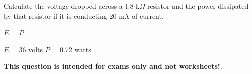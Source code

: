 

Calculate the voltage dropped across a 1.8 k$\Omega$ resistor and the power dissipated by that resistor if it is conducting 20 mA of current.

\vskip 10pt

$E$ = \hskip 150pt $P$ =







$E$ = 36 volts \hskip 100pt $P$ = 0.72 watts







{\bf This question is intended for exams only and not worksheets!}.



